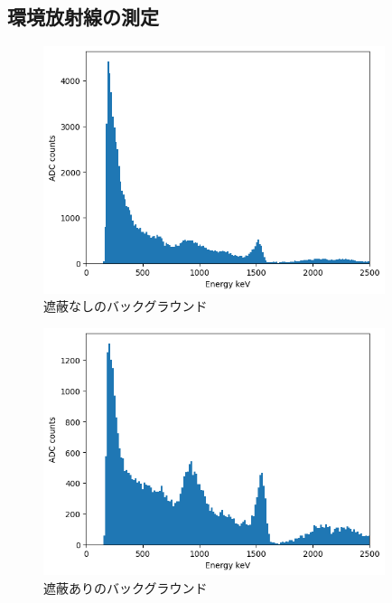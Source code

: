 \documentclass[dvipdfmx]{jreport}
\begin{document}
\subsection{環境放射線の測定}
\begin{figure}[htbp]
  \centering
  \includegraphics[width=100mm]{figure/background.png}
  \caption{遮蔽なしのバックグラウンド \label{background}}
\end{figure}
\begin{figure}[htbp]
  \centering
  \includegraphics[width=100mm]{figure/background_attenated.png}
  \caption{遮蔽ありのバックグラウンド \label{background_attenated}}
\end{figure}
\end{document}
